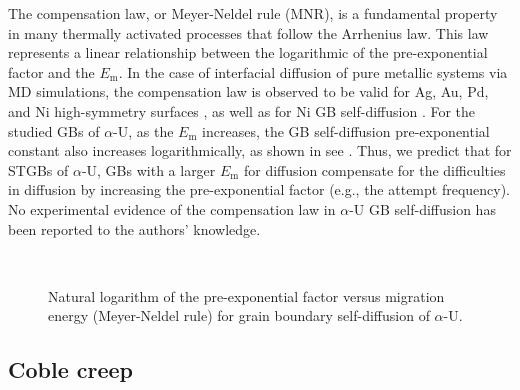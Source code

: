 \documentclass[review]{elsarticle}
\begin{document}
The compensation law, or Meyer-Neldel rule (MNR), is a fundamental property in many thermally activated processes that follow the Arrhenius law. This law represents a linear relationship between the logarithmic of the pre-exponential factor and the $E_{\mathrm{m}}$. In the case of interfacial diffusion of pure metallic systems via MD simulations, the compensation law is observed to be valid for Ag, Au, Pd, and Ni high-symmetry surfaces \cite{compansation}, as well as for Ni GB self-diffusion \cite{Mendelev2005}. For the studied GBs of $\alpha$-U, as the $E_{\mathrm{m}}$ increases, the GB self-diffusion pre-exponential constant also increases logarithmically, as shown in see . Thus, we predict that for STGBs of $\alpha$-U, GBs with a larger $E_{\mathrm{m}}$ for diffusion compensate for the difficulties in diffusion by increasing the pre-exponential factor (e.g., the attempt frequency). No experimental evidence of the compensation law in $\alpha$-U GB self-diffusion has been reported to the authors' knowledge.

\begin{figure}[h!]
\centering
{}\\
\caption{Natural logarithm of the pre-exponential factor versus migration energy (Meyer-Neldel rule) for grain boundary self-diffusion of $\alpha$-U.}
\label{fig:compan}
\end{figure}

\subsection{Coble creep}
\end{document}
